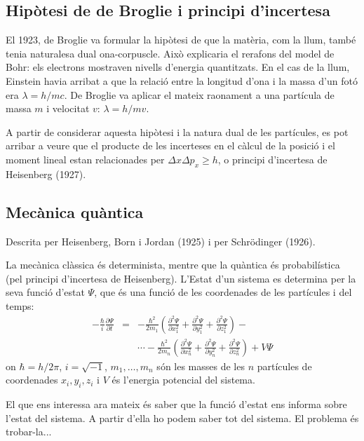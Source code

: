 \subsection{Hipòtesi de de Broglie i principi d'incertesa}
El 1923, de Broglie va formular la hipòtesi de que la matèria, com la llum, també tenia naturalesa dual ona-corpuscle. 
Això explicaria el rerafons del model de Bohr: els electrons mostraven nivells d'energia quantitzats.
En el cas de la llum, Einstein havia arribat a que la relació entre la longitud d'ona i la massa d'un fotó era $\lambda=h/mc$. De Broglie va aplicar el mateix raonament a una partícula de massa $m$ i velocitat $v$: $\lambda=h/mv$.

A partir de considerar aquesta hipòtesi i la natura dual de les partícules, es pot arribar a veure que el producte de les incerteses en el càlcul de la posició i el moment lineal estan relacionades per $\Delta x \Delta p_x \geq h$, o principi d'incertesa de Heisenberg (1927).

\subsection{Mecànica quàntica}

Descrita per Heisenberg, Born i Jordan (1925) i per Schrödinger (1926). 

La mecànica clàssica és determinista, mentre que la quàntica és probabilística (pel principi d'incertesa de Heisenberg). L'Estat d'un sistema es determina per la seva funció d'estat $\Psi$, que és una funció de les coordenades de les partícules i del temps:
\begin{eqnarray}
-\frac{\hbar}{i} \frac{\partial \Psi}{\partial t}&=&-\frac{\hbar^2}{2m_1}\left(\frac{\partial^2\Psi}{\partial x_1^2}+\frac{\partial^2\Psi}{\partial y_1^2}+\frac{\partial^2\Psi}{\partial z_1^2} \right)-\\
 & & \cdots -\frac{\hbar^2}{2m_n}\left(\frac{\partial^2\Psi}{\partial x_n^2}+\frac{\partial^2\Psi}{\partial y_n^2}+\frac{\partial^2\Psi}{\partial z_n^2} \right) + V \Psi
\end{eqnarray}
on $\hbar=h/2\pi$, $i=\sqrt{-1}$, $m_1,\dots , m_n$ són les masses de les $n$ partícules de coordenades $x_i,y_i,z_i$ i $V$ és l'energia potencial del sistema.

El que ens interessa ara mateix és saber que la funció d'estat ens informa sobre l'estat del sistema.
A partir d'ella ho podem saber tot del sistema. El problema és trobar-la...

